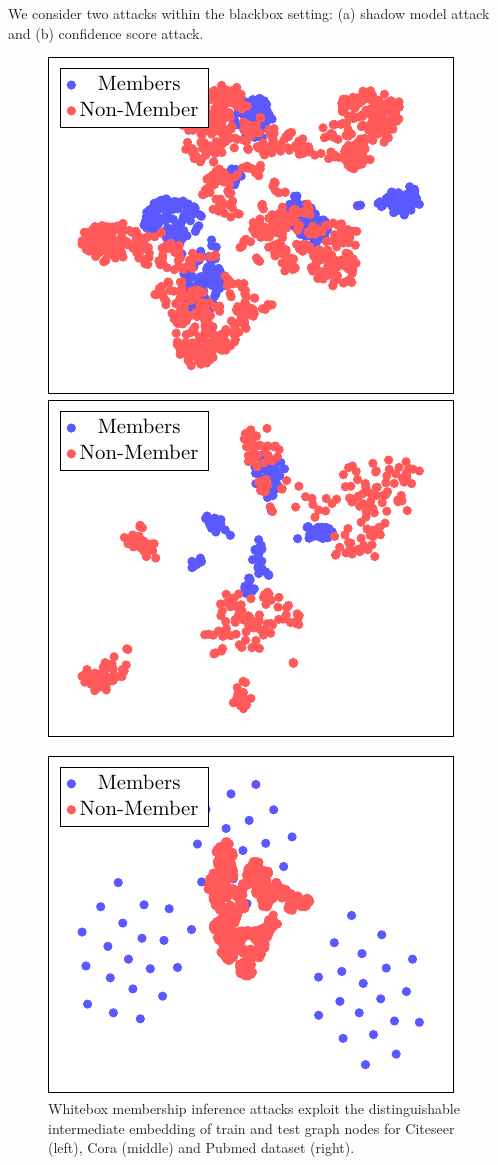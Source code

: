We consider two attacks within the blackbox setting: (a) shadow model attack and (b) confidence score attack.

\begin{figure}[!htb]
\centering
    \includegraphics[width=.23\textwidth]{figures/EmbeddingMIA/citeseer.pdf}\hfill
    \includegraphics[width=.23\textwidth]{figures/EmbeddingMIA/cora.pdf}\hfill

    \includegraphics[width=.23\textwidth]{figures/EmbeddingMIA/pubmed.pdf}
\vspace{-2mm}
\caption{Whitebox membership inference attacks exploit the distinguishable intermediate embedding of train and test graph nodes for Citeseer (left), Cora (middle) and Pubmed dataset (right).}
\label{embedding}
\vspace{-3mm}
\end{figure}

